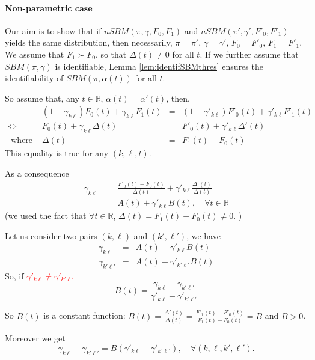 \paragraph{Non-parametric case}
Our aim is to show that if $nSBM(\pi, \gamma, F_0, F_1)$ and $nSBM(\pi', \gamma', F'_0, F'_1)$ yields the same distribution, then necessarily, $\pi = \pi'$, $\gamma = \gamma'$, $F_0 = F'_0$, $F_1 = F'_1$. We assume that $F_1 \succ F_0$, so that $\Delta(t) \neq 0$ for all $t$. If we further assume that $SBM(\pi, \gamma)$ is identifiable, Lemma \ref{lem:identifSBMthres} ensures the identifiability of $SBM(\pi, \alpha(t))$ for all $t$.

So assume that,  any $t \in \mathbb{R}$,  $\alpha(t) = \alpha'(t)$, then, 
$$
\begin{array}{crcl}
& (1-\gamma_{k\ell}) F_0(t) + \gamma_{k\ell} F_1(t) &=& (1-\gamma'_{k\ell}) F'_0(t) + \gamma'_{k\ell} F'_1(t) \\
\Leftrightarrow&
 F_0(t) +\gamma_{k\ell}  \Delta(t) &=&F'_0(t) +  \gamma'_{k\ell} \Delta'(t)\\
 \mbox{ where }& \Delta(t) &=&F_1(t)-F_0(t)
\end{array}
$$
This equality is true for any $(k,\ell,t)$. 

As a consequence
\begin{eqnarray*}
 \gamma_{k\ell} &=& \frac{F'_0(t)  - F_0(t)}{\Delta(t)}+  \gamma'_{k\ell} \frac{\Delta'(t)}{\Delta(t)}\\
 &=& A(t) + \gamma'_{k\ell}B(t), \quad \forall t  \in \mathbb{R}
 \end{eqnarray*}
 (we used the fact that $\forall t \in \mathbb{R}$, $\Delta (t) = F_1(t) - F_0(t) \neq 0$. )
 
 Let us consider two pairs $(k,\ell)$ and $(k',\ell')$, we have 
\begin{eqnarray*}
 \gamma_{k\ell} &=& A(t) + \gamma'_{k\ell}B(t)\\
 \gamma_{k'\ell'} &=& A(t) + \gamma'_{k'\ell'}B(t)
 \end{eqnarray*}
So, if \textcolor{red}{$ \gamma'_{k\ell} \neq  \gamma'_{k'\ell'}$}
$$B(t)  = \frac{ \gamma_{k\ell}  -  \gamma_{k'\ell'} }{  \gamma'_{k\ell}-\gamma'_{k'\ell'} }
$$ 
 
 So $B(t)$ is a constant function: 
 $B(t) = \frac{\Delta'(t)}{\Delta(t)} = \frac{F'_1(t) - F'_0(t)}{F_1(t) - F_0(t)}  = B$
 and $B>0$. 
 
 Moreover we get $$  \gamma_{k\ell}  -  \gamma_{k'\ell'}  = B ( \gamma'_{k\ell}  -  \gamma'_{k'\ell'}),\quad  \forall (k,\ell,k',\ell').$$ 
  
